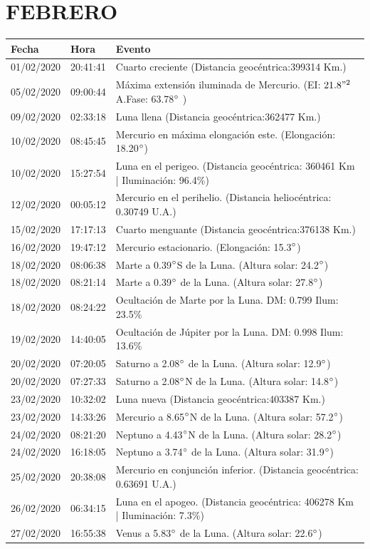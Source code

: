 \documentclass[12pt,a4paper,oneside]{article}
\begin{document}
\section{FEBRERO}
\begin{center}
\begin{tabular}{ |l| l| l| }
\hline
 \textbf{Fecha} & \textbf{Hora} & \textbf{Evento}\\
 \hline
01/02/2020 &  20:41:41   &  Cuarto creciente (Distancia geocéntrica:399314 Km.)	  \\
05/02/2020 &  09:00:44   &  Máxima extensión iluminada de Mercurio. (EI: $21.8"^2$ A.Fase: 63.78$\degree$ ) 	  \\
09/02/2020 &  02:33:18   &  Luna llena (Distancia geocéntrica:362477 Km.)	  \\
10/02/2020 &  08:45:45   &  Mercurio en máxima elongación este. (Elongación: 18.20$\degree$)	  \\
10/02/2020 &  15:27:54   &  Luna en el perigeo. (Distancia geocéntrica: 360461 Km | Iluminación: 96.4\%)	  \\
12/02/2020 &  00:05:12   &  Mercurio en el perihelio. (Distancia heliocéntrica: 0.30749 U.A.)	  \\
15/02/2020 &  17:17:13   &  Cuarto menguante (Distancia geocéntrica:376138 Km.)	  \\
16/02/2020 &  19:47:12   &  Mercurio estacionario. (Elongación: 15.3$\degree$)	  \\
18/02/2020 &  08:06:38   &  Marte a 0.39$\degree$S de la Luna. (Altura solar: 24.2$\degree$)	  \\
18/02/2020 &  08:21:14   &  Marte a 0.39$\degree$ de la Luna. (Altura solar: 27.8$\degree$)	  \\
18/02/2020 &  08:24:22   &  Ocultación de Marte por la Luna. DM: 0.799 Ilum: 23.5\%	  \\
19/02/2020 &  14:40:05   &  Ocultación de Júpiter por la Luna. DM: 0.998 Ilum: 13.6\%	  \\
20/02/2020 &  07:20:05   &  Saturno a 2.08$\degree$ de la Luna. (Altura solar: 12.9$\degree$)	  \\
20/02/2020 &  07:27:33   &  Saturno a 2.08$\degree$N de la Luna. (Altura solar: 14.8$\degree$)	  \\
23/02/2020 &  10:32:02   &  Luna nueva (Distancia geocéntrica:403387 Km.)	  \\
23/02/2020 &  14:33:26   &  Mercurio a 8.65$\degree$N de la Luna. (Altura solar: 57.2$\degree$)	  \\
24/02/2020 &  08:21:20   &  Neptuno a 4.43$\degree$N de la Luna. (Altura solar: 28.2$\degree$)	  \\
24/02/2020 &  16:18:05   &  Neptuno a 3.74$\degree$ de la Luna. (Altura solar: 31.9$\degree$)	  \\
25/02/2020 &  20:38:08   &  Mercurio en conjunción inferior. (Distancia geocéntrica: 0.63691 U.A.)	  \\
26/02/2020 &  06:34:15   &  Luna en el apogeo. (Distancia geocéntrica: 406278 Km | Iluminación: 7.3\%)	  \\
27/02/2020 &  16:55:38   &  Venus a 5.83$\degree$ de la Luna. (Altura solar: 22.6$\degree$)	  \\
\hline
\end{tabular}
\end{center}
\end{document}
